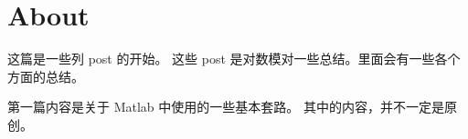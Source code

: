 
\section{About}
\label{sec:about}
这篇是一些列 post 的开始。
这些 post 是对数模对一些总结。里面会有一些各个方面的总结。

第一篇内容是关于 Matlab 中使用的一些基本套路。
其中的内容，并不一定是原创。
\endinput
